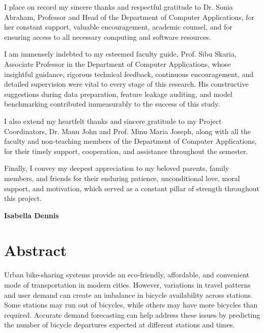 \documentclass[12pt, a4paper]{article}
\renewcommand{\_}{\textunderscore\allowbreak}
\begin{document}
I place on record my sincere thanks and respectful gratitude to Dr. Sonia Abraham, Professor and Head of the Department of Computer Applications, for her constant support, valuable encouragement, academic counsel, and for ensuring access to all necessary computing and software resources.

I am immensely indebted to my esteemed faculty guide, Prof. Sibu Skaria, Associate Professor in the Department of Computer Applications, whose insightful guidance, rigorous technical feedback, continuous encouragement, and detailed supervision were vital to every stage of this research. His constructive suggestions during data preparation, feature leakage auditing, and model benchmarking contributed immeasurably to the success of this study.

I also extend my heartfelt thanks and sincere gratitude to my Project Coordinators, Dr. Manu John and Prof. Minu Maria Joseph, along with all the faculty and non-teaching members of the Department of Computer Applications, for their timely support, cooperation, and assistance throughout the semester.

Finally, I convey my deepest appreciation to my beloved parents, family members, and friends for their enduring patience, unconditional love, moral support, and motivation, which served as a constant pillar of strength throughout this project.

\vspace{1.5cm}
\begin{flushright}
\textbf{Isabella Dennis}
\end{flushright}

\newpage

\section*{Abstract}

Urban bike-sharing systems provide an eco-friendly, affordable, and convenient mode of transportation in modern cities. However, variations in travel patterns and user demand can create an imbalance in bicycle availability across stations. Some stations may run out of bicycles, while others may have more bicycles than required. Accurate demand forecasting can help address these issues by predicting the number of bicycle departures expected at different stations and times.
\end{document}
